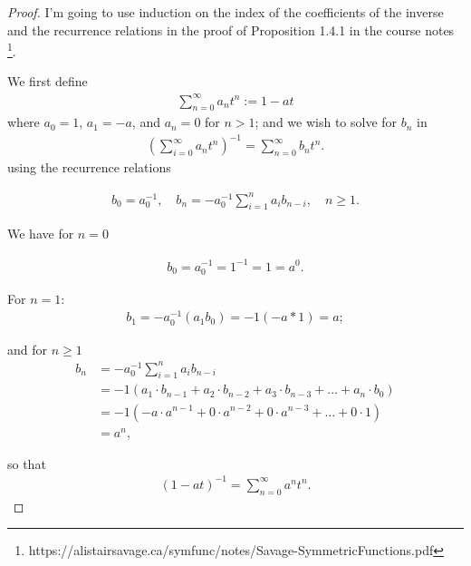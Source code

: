 \documentclass[12pt]{extarticle}
\newcommand{\<}{\langle}
\renewcommand{\>}{\rangle}
\theoremstyle{definition}
\begin{document}
\begin{proof}
  I'm going to use induction on the index of the coefficients of the inverse and the recurrence relations in the proof of Proposition 1.4.1 in the course notes \footnote{https://alistairsavage.ca/symfunc/notes/Savage-SymmetricFunctions.pdf}.

  We first define
  \begin{align*}
   \sum\limits_{n=0}^{\infty} a_nt^n :=  1-at
  \end{align*}
  where $a_0 = 1$, $a_1 = -a$, and $a_n = 0$ for $n > 1$; and we wish to solve for $b_n$ in 
  \begin{align*}
    (\sum\limits_{i=0}^{\infty} a_nt^n)^{-1}  = \sum\limits_{n=0}^{\infty} b_n t^n.
  \end{align*}
  using the recurrence relations

  \begin{align*}
    b_0 = a_0^{-1}, \quad b_n = -a_0^{-1} \sum\limits_{i=1}^{n
    }a_i b_{n-i}, \quad n \geq 1.
  \end{align*}

  We have for $n=0$

  \begin{align*}
    b_0 = a_0^{-1}= 1^{-1} = 1 = a^0.
  \end{align*}

  For $n=1$:
  \begin{align*}
    b_1 = -a_0^{-1}(a_1 b_0) = -1 (-a*1) = a;
  \end{align*}

  and for $n \geq 1$
  \begin{align*}
    b_n
    &= -a_0^{-1}\sum\limits_{i=1}^n a_i b_{n-i} \\
    &= -1 (a_1\cdot b_{n-1} + a_2 \cdot b_{n-2} + a_3 \cdot b_{n-3} + \dots + a_n \cdot b_0) \\
    &= -1 (-a \cdot a^{n-1} + 0 \cdot a^{n-2} + 0 \cdot a^{n-3} + \dots + 0 \cdot1) \\
    &= a^n,
  \end{align*}

  so that
    \begin{align*}
    (1-at)^{-1} = \sum\limits_{n=0}^{\infty} a^n t^n.
  \end{align*}

\end{proof}
\end{document}
